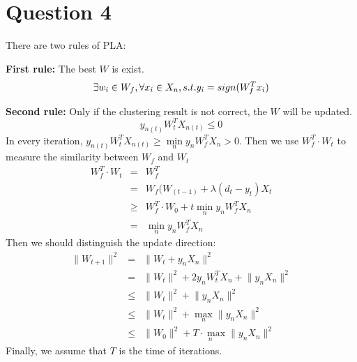 \documentclass[12pt,letterpaper]{article}
\begin{document}
\section*{Question 4}
There are two rules of PLA:
\par{\bf First rule:} The best $W$ is exist.
\begin{equation}\label{q4eq1}
  \exists w_i\in W_f, \forall x_i\in X_n,\\
  s.t. y_i=sign(W_f^Tx_i)
\end{equation}
\par{\bf Second rule:} Only if the clustering result is not correct, the $W$ will be updated.
\begin{equation}\label{q4eq2}
  y_{n\left( t \right)}W_t^TX_{n\left( t \right)}\leqslant 0
\end{equation}
In every iteration, $y_{n\left( t \right)}W_t^TX_{n\left( t \right)}\geqslant \underset{n}{\min}y_nW_f^TX_n>0$. Then we use $W_{f}^{T}\cdot W_t$ to measure the similarity between $W_f$ and $W_t$
\begin{eqnarray}\label{q4eq3}
  W_{f}^{T}\cdot W_t
  &=& W_{f}^{T}\\
  &=& W_{f}(W_(t-1)+\lambda(d_t-y_t)X_t\nonumber\\
  &\geqslant & W_{f}^{T}\cdot W_0+t\underset{n}{\min}y_nW_f^TX_n\nonumber\\
  &=& \underset{n}{\min}y_nW_f^TX_n \nonumber
\end{eqnarray}
Then we should distinguish the update direction:
\begin{eqnarray}
\lVert W_{t+1} \rVert ^2
    &=&\lVert W_t+y_nX_n \rVert ^2\\
    &=&\lVert W_t \rVert ^2+2y_nW_t^TX_n+\lVert y_nX_n \rVert ^2\nonumber\\
    &\leqslant& \lVert W_t \rVert ^2+\lVert y_nX_n \rVert ^2\nonumber\\
    &\leqslant& \lVert W_t \rVert ^2+\underset{n}{\max}\lVert y_nX_n \rVert ^2\nonumber\\
    &\leqslant& \lVert W_0 \rVert ^2+\underset{n}{T\cdot \max}\lVert y_nX_n \rVert ^2\nonumber
\end{eqnarray}
Finally, we assume that $T$ is the time of iterations.
\end{document}
